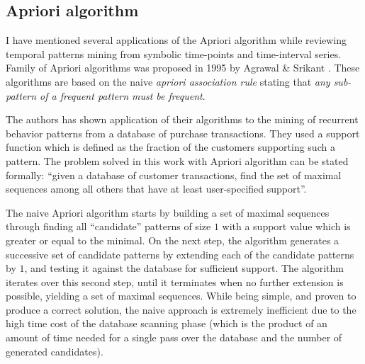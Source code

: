 \subsection{Apriori algorithm}\label{apriori}
I have mentioned several applications of the Apriori algorithm while reviewing temporal patterns mining from symbolic time-points and time-interval series. Family of Apriori algorithms was proposed in 1995 by Agrawal \& Srikant \cite{citeulike:775528}. These algorithms are based on the naive \textit{apriori association rule} stating that \textit{any sub-pattern of a frequent pattern must be frequent}. 

The authors has shown application of their algorithms to the mining of recurrent behavior patterns from a database of purchase transactions. They used a support function which is defined as the fraction of the customers supporting such a pattern. The problem solved in this work with Apriori algorithm can be stated formally: ``given a database of customer transactions, find the set of maximal sequences among all others that have at least user-specified support''.

The naive Apriori algorithm starts by building a set of maximal sequences through finding all ``candidate'' patterns of size $1$ with a support value which is greater or equal to the minimal. On the next step, the algorithm generates a successive set of candidate patterns by extending each of the candidate patterns by $1$, and testing it against the database for sufficient support. The algorithm iterates over this second step, until it terminates when no further extension is possible, yielding a set of maximal sequences. While being simple, and proven to produce a correct solution, the naive approach is extremely inefficient due to the high time cost of the database scanning phase (which is the product of an amount of time needed for a single pass over the database and the number of generated candidates).

